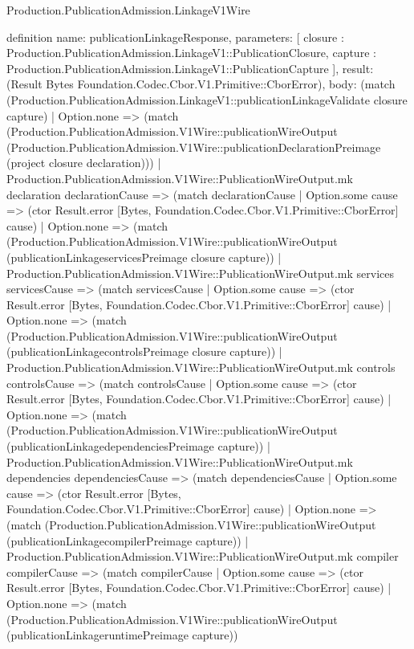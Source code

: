 \begin{lexlean}{Production.PublicationAdmission.LinkageV1Wire}
\begin{semanticmodule}
definition{
  name: publicationLinkageResponse,
  parameters: [
    closure : Production.PublicationAdmission.LinkageV1::PublicationClosure,
    capture : Production.PublicationAdmission.LinkageV1::PublicationCapture
  ],
  result: (Result Bytes Foundation.Codec.Cbor.V1.Primitive::CborError),
  body: (match (Production.PublicationAdmission.LinkageV1::publicationLinkageValidate closure capture)
    | Option.none => (match (Production.PublicationAdmission.V1Wire::publicationWireOutput (Production.PublicationAdmission.V1Wire::publicationDeclarationPreimage (project closure declaration)))
      | Production.PublicationAdmission.V1Wire::PublicationWireOutput.mk declaration declarationCause => (match declarationCause
        | Option.some cause => (ctor Result.error [Bytes, Foundation.Codec.Cbor.V1.Primitive::CborError] cause)
        | Option.none => (match (Production.PublicationAdmission.V1Wire::publicationWireOutput (publicationLinkageservicesPreimage closure capture))
          | Production.PublicationAdmission.V1Wire::PublicationWireOutput.mk services servicesCause => (match servicesCause
            | Option.some cause => (ctor Result.error [Bytes, Foundation.Codec.Cbor.V1.Primitive::CborError] cause)
            | Option.none => (match (Production.PublicationAdmission.V1Wire::publicationWireOutput (publicationLinkagecontrolsPreimage closure capture))
              | Production.PublicationAdmission.V1Wire::PublicationWireOutput.mk controls controlsCause => (match controlsCause
                | Option.some cause => (ctor Result.error [Bytes, Foundation.Codec.Cbor.V1.Primitive::CborError] cause)
                | Option.none => (match (Production.PublicationAdmission.V1Wire::publicationWireOutput (publicationLinkagedependenciesPreimage capture))
                  | Production.PublicationAdmission.V1Wire::PublicationWireOutput.mk dependencies dependenciesCause => (match dependenciesCause
                    | Option.some cause => (ctor Result.error [Bytes, Foundation.Codec.Cbor.V1.Primitive::CborError] cause)
                    | Option.none => (match (Production.PublicationAdmission.V1Wire::publicationWireOutput (publicationLinkagecompilerPreimage capture))
                      | Production.PublicationAdmission.V1Wire::PublicationWireOutput.mk compiler compilerCause => (match compilerCause
                        | Option.some cause => (ctor Result.error [Bytes, Foundation.Codec.Cbor.V1.Primitive::CborError] cause)
                        | Option.none => (match (Production.PublicationAdmission.V1Wire::publicationWireOutput (publicationLinkageruntimePreimage capture))
}
\end{semanticmodule}
\end{lexlean}
